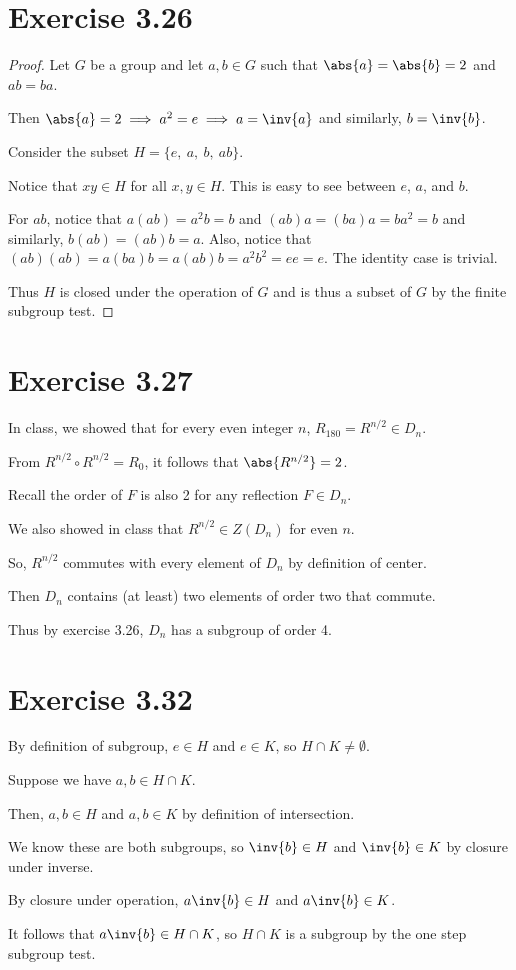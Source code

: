 \documentclass{article}
\begin{document}
\section*{Exercise 3.26}
\begin{proof}
    Let \(G\) be a group and let \(a,b\in G\) such that \(\abs{a}=\abs{b}=2\) and \(ab=ba\).

    Then \(\abs{a}=2 \implies a^2=e \implies a=\inv{a}\) and similarly, \(b=\inv{b}\).

    Consider the subset \(H=\{e,\ a,\ b,\ ab\}\).

    Notice that \(xy\in H\) for all \(x,y\in H\). This is easy to see between \(e\), \(a\), and \(b\).

    For \(ab\), notice that \(a(ab)=a^2b=b\) and \((ab)a=(ba)a=ba^2=b\) and similarly, \(b(ab)=(ab)b=a\). Also, notice that \((ab)(ab)=a(ba)b=a(ab)b=a^2b^2=ee=e\). The identity case is trivial.

    Thus \(H\) is closed under the operation of \(G\) and is thus a subset of \(G\) by the finite subgroup test.
\end{proof}

\section*{Exercise 3.27}
In class, we showed that for every even integer \(n\), \(R_{180}=R^{n/2}\in D_n\).

From \(R^{n/2} \circ R^{n/2} = R_0\), it follows that \(\abs{R^{n/2}}=2\).

Recall the order of \(F\) is also 2 for any reflection \(F\in D_n\).

We also showed in class that \(R^{n/2}\in Z(D_n)\) for even \(n\).

So, \(R^{n/2}\) commutes with every element of \(D_n\) by definition of center.

Then \(D_n\) contains (at least) two elements of order two that commute.

Thus by exercise 3.26, \(D_n\) has a subgroup of order 4.

\section*{Exercise 3.32}
By definition of subgroup, \(e\in H\) and \(e\in K\), so \(H\cap K\neq \emptyset\).

Suppose we have \(a, b\in H\cap K\).

Then, \(a, b\in H\) and \(a,b\in K\) by definition of intersection.

We know these are both subgroups, so \(\inv{b}\in H\) and \(\inv{b}\in K\) by closure under inverse.

By closure under operation, \(a\inv{b}\in H\) and \(a\inv{b}\in K\).

It follows that \(a\inv{b}\in H\cap K\), so \(H\cap K\) is a subgroup by the one step subgroup test.
\end{document}
